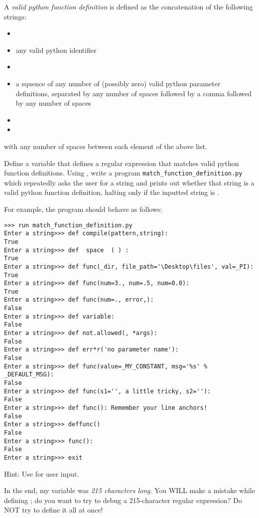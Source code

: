 \begin{problem}
A \emph{valid python function definition} is defined as the concatenation of the following strings:
\begin{itemize}
    \item {}
    \item any valid python identifier
    \item {}
    \item a squence of any number of (possibly zero) valid python parameter definitions, separated by any number of spaces followed by a comma followed by any number of spaces
    \item {}
    \item {}
\end{itemize}
with any number of spaces between each element of the above list.

Define a variable  that defines a regular expression that matches valid python function definitions. Using 
, write a program \texttt{match\_function\_definition.py}
which repeatedly asks the user for a string and prints out whether that string is a valid python function definition, halting only if the inputted string is .

For example, the program should behave as follows:
\begin{lstlisting}
>>> run match_function_definition.py
Enter a string>>> def compile(pattern,string):
True
Enter a string>>> def  space  ( ) :
True
Enter a string>>> def func(_dir, file_path='\Desktop\files', val=_PI):
True
Enter a string>>> def func(num=3., num=.5, num=0.0):
True
Enter a string>>> def func(num=., error,):
False
Enter a string>>> def variable:
False
Enter a string>>> def not.allowed(, *args):
False
Enter a string>>> def err*r('no parameter name'):
False
Enter a string>>> def func(value=_MY_CONSTANT, msg='%s' % _DEFAULT_MSG):
False
Enter a string>>> def func(s1='', a little tricky, s2=''):
False
Enter a string>>> def func(): Remember your line anchors!
False
Enter a string>>> deffunc()
False
Enter a string>>> func():
False
Enter a string>>> exit

\end{lstlisting}
Hint: Use  for user input.

\begin{warn}
In the end, my variable  was \emph{215 characters long}. You WILL make a mistake while defining ; do you want to try to debug a 215-character regular expression? Do NOT try to define it all at once!


\end{warn}
\end{problem}
